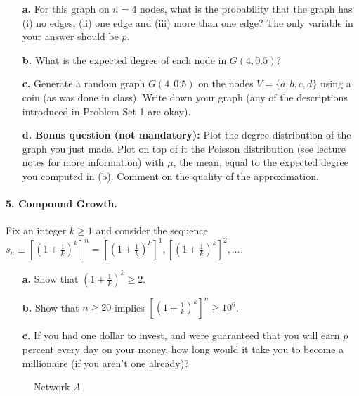 \documentclass[11pt]{article}
\theoremstyle{definition} \newtheorem{Theorem}{theorem}
\begin{document}
\begin{enumerate}

\item[\textbf{a.}] For this graph on $n=4$ nodes, what is the probability that the graph has  (i) no edges, (ii) one edge and (iii) more than one edge? The only variable in your answer should be $p$.

\item[\textbf{b.}] What is the expected degree of each node in $G(4,0.5)$?

\item[\textbf{c.}] Generate a random graph $G(4,0.5)$ on the nodes  $V=\{a,b,c,d\}$ using a coin (as was done in class). Write down your graph (any of the descriptions introduced in Problem Set 1 are okay).

\item[\textbf{d.}] \textbf{Bonus question (not mandatory):} Plot the degree distribution of the graph you just made. Plot on top of it the Poisson distribution (see lecture notes for more information) with $\mu$, the mean, equal to the expected degree you computed in (b). Comment on the quality of the approximation.


\end{enumerate}


\paragraph{5. Compound Growth.} Fix an integer $k \geq 1$ and consider the sequence $s_n \equiv \left[(1+\frac{1}{k})^{k} \right]^n = \left[(1+\frac{1}{k})^k\right]^1, \left[(1+\frac{1}{k})^k\right]^2, \dots$. 
\begin{itemize}
\item[\textbf{a.}] Show that $\left( 1 + \frac{1}{k} \right)^{k} \geq 2$. 
\item[\textbf{b.}]  Show that $n \geq 20$ implies  $\left[(1+\frac{1}{k})^{k} \right]^n \geq 10^6$. 
\item[\textbf{c.}] If you had one dollar to invest, and were guaranteed that you will earn $p$ percent every day on your money, how long would it take you to become a millionaire (if you aren't one already)? 
\end{itemize}


\begin{figure}[t] 
\centering
\caption{Network $A$}
\label{example}
\end{figure}
\end{document}
